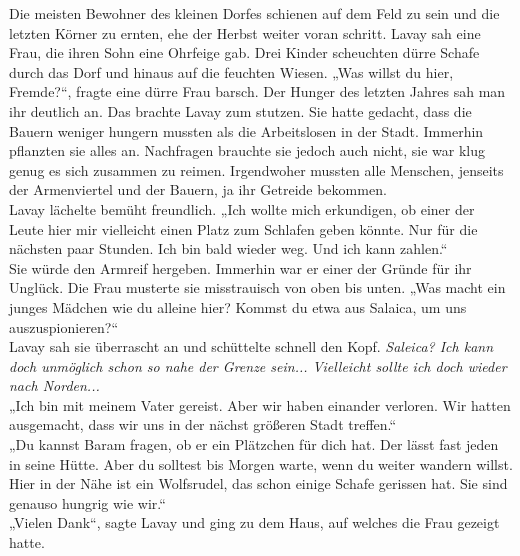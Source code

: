 Die meisten Bewohner des kleinen Dorfes schienen auf dem Feld zu sein und die letzten Körner 
zu ernten, ehe der Herbst weiter voran schritt. Lavay sah eine Frau, die ihren Sohn eine Ohrfeige 
gab. Drei Kinder scheuchten dürre Schafe durch das Dorf und hinaus auf die feuchten Wiesen. 
„Was willst du hier, Fremde?“, fragte eine dürre Frau barsch. Der Hunger des letzten Jahres 
sah man ihr deutlich an. Das brachte Lavay zum stutzen. Sie hatte gedacht, dass die Bauern weniger 
hungern mussten als die Arbeitslosen in der Stadt. Immerhin pflanzten sie alles an. Nachfragen 
brauchte sie jedoch auch nicht, sie war klug genug es sich zusammen zu reimen. Irgendwoher mussten 
alle Menschen, jenseits der Armenviertel und der Bauern, ja ihr Getreide bekommen.\\
Lavay lächelte bemüht freundlich. „Ich wollte mich erkundigen, ob einer der Leute hier mir 
vielleicht einen Platz zum Schlafen geben könnte. Nur für die nächsten paar Stunden. Ich bin bald 
wieder weg. Und ich kann zahlen.“\\
Sie würde den Armreif hergeben. Immerhin war er einer der Gründe für ihr Unglück. Die Frau musterte 
sie misstrauisch von oben bis unten. „Was macht ein junges Mädchen wie du alleine hier? Kommst du 
etwa aus Salaica, um uns auszuspionieren?“\\
Lavay sah sie überrascht an und schüttelte schnell den Kopf. \textit{Saleica? Ich kann doch 
unmöglich schon so nahe der Grenze sein... Vielleicht sollte ich doch wieder nach Norden...}\\
„Ich bin mit meinem Vater gereist. Aber wir haben einander verloren. Wir hatten ausgemacht, dass 
wir uns in der nächst größeren Stadt treffen.“\\
„Du kannst Baram fragen, ob er ein Plätzchen für dich hat. Der lässt fast jeden in seine Hütte. Aber 
du solltest bis Morgen warte, wenn du weiter wandern willst. Hier in der Nähe ist ein Wolfsrudel, 
das schon einige Schafe gerissen hat. Sie sind genauso hungrig wie wir.“\\
„Vielen Dank“, sagte Lavay und ging zu dem Haus, auf welches die Frau gezeigt hatte.\\

